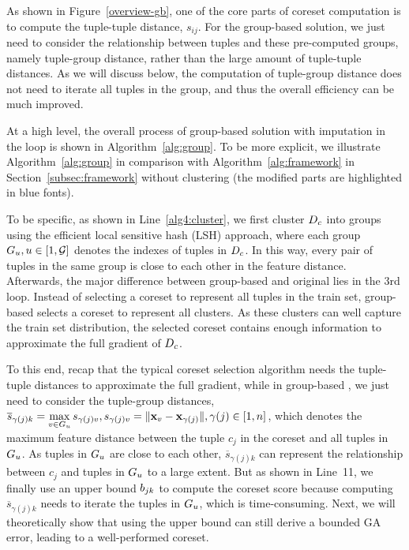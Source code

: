 As shown in Figure~\ref{overview-gb}, one of the core parts of coreset computation is to compute the tuple-tuple distance, \ie $s_{ij}$. For the group-based solution, we just need to consider the relationship between tuples and these pre-computed groups, namely tuple-group distance, rather than the large amount of tuple-tuple distances. As we will discuss below, the computation of tuple-group distance does not need to iterate all tuples in the group, and thus  the overall efficiency can be much improved. 

At a high level, the overall process of group-based \ours solution with imputation in the loop is shown in Algorithm~\ref{alg:group}. To be more explicit, we illustrate Algorithm~\ref{alg:group} in comparison with Algorithm~\ref{alg:framework} in Section~\ref{subsec:framework} without clustering (the modified parts are highlighted in blue fonts).

To be specific, as shown in Line~\ref{alg4:cluster}, we first cluster $D_c$ into groups using the efficient local sensitive hash (LSH) approach, where each group $G_u, u\in[1, \mathcal{G}]$ denotes the indexes of tuples in $D_c$. In this way, every pair of tuples in the same group is close to each other in the feature distance.
%
 Afterwards, the major difference between group-based \ours and original \ours lies in the 3rd loop. Instead of  selecting a coreset to represent all tuples in the train set, group-based \ours selects a coreset to represent all clusters. As these clusters can well capture the train set distribution, the selected coreset contains enough information to approximate the full gradient of $D_c$. 
 
 To this end, recap that the typical coreset selection algorithm needs the tuple-tuple distances to approximate the full gradient, while in group-based \ours, we just need to consider the tuple-group distances, \ie  
$\overline{s}_{\gamma(j)k} = \max\limits_{v \in G_u} s_{\gamma(j)v}, s_{\gamma(j)v} = \lVert\mathbf{x}_v - \mathbf{x}_{\gamma(j)}\rVert, \gamma(j)\in[1, n]$, which denotes the maximum feature distance between the tuple $c_j$ in the coreset and all tuples in $G_u$. As tuples in $G_u$ are close to each other, $\overline{s}_{\gamma(j)k}$ can represent the relationship between $c_j$ and tuples in $G_u$ to a large extent. But as shown in Line~11, we finally use an upper bound $b_{jk}$ to compute the coreset score because computing $\overline{s}_{\gamma(j)k}$ needs to iterate the tuples in $G_u$, which is time-consuming. Next, we will theoretically show that using the upper bound can still derive a bounded GA error, leading to a well-performed coreset. 

